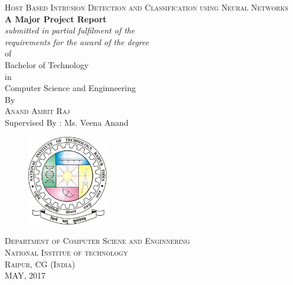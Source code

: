 \documentclass[12pt]{article}
\newcommand{\projectTitle}{Host Based Intrusion Detection and Classification using Neural Networks}
\begin{document}
	\begin{titlepage}
		\vspace*{\fill}
		\begin{center}
			\textsc{\Large \projectTitle}\\
			[0.5in]
			\textbf{A Major Project Report}\\
			[.25in]
			\textit{submitted in partial fulfilment of the} \\
			\textit{requirements for the award of the degree}\\
			[.25in]
			of\\
			[.25in]
			Bachelor of Technology \\
			[.25in]
			in\\
			[.25in]
			Computer Science and Enginneering\\
			By\\
			[.5in]
			\textsc{Anand Amrit Raj}\\
			Supervised By : Ms. Veena Anand\\
			[.5in]
			\begin{figure}[!h]
				\centering
				\includegraphics[width=100pt]{pictures/nitrr-logo.jpg}
			\end{figure}
			\vspace{.25in}
			\textsc{Department of Computer Sciene and Enginnering}\\
			\textsc{National Institue of technology}\\
			\textsc{Raipur, CG (India)}\\
			MAY, 2017
		\end{center}
		\vspace*{\fill}
	\end{titlepage}
	
	
\end{document}
